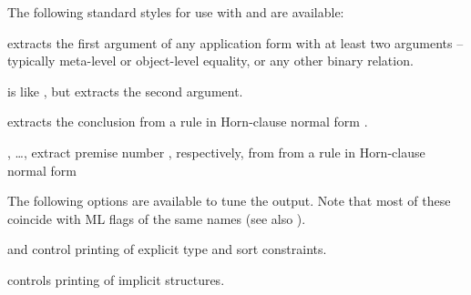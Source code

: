 \begin{isabellebody}
\begin{isamarkuptext}
\begin{descr}
  \end{descr}

  \medskip The following standard styles for use with  and  are available:

  \begin{descr}
  
  \item [\isa{lhs}] extracts the first argument of any application
  form with at least two arguments -- typically meta-level or
  object-level equality, or any other binary relation.
  
  \item [\isa{rhs}] is like , but extracts the second
  argument.
  
  \item [\isa{{\isachardoublequote}concl{\isachardoublequote}}] extracts the conclusion  from a rule
  in Horn-clause normal form .
  
  \item [\isa{{\isachardoublequote}prem{\isadigit{1}}{\isachardoublequote}}, \dots, \isa{{\isachardoublequote}prem{\isadigit{9}}{\isachardoublequote}}] extract premise
  number , respectively, from from a rule in
  Horn-clause normal form 

  \end{descr}

  \medskip
  The following options are available to tune the output.  Note that most of
  these coincide with ML flags of the same names (see also \cite{isabelle-ref}).

  \begin{descr}

  \item[\isa{{\isachardoublequote}show{\isacharunderscore}types\ {\isacharequal}\ bool{\isachardoublequote}} and \isa{{\isachardoublequote}show{\isacharunderscore}sorts\ {\isacharequal}\ bool{\isachardoublequote}}]
  control printing of explicit type and sort constraints.

  \item[\isa{{\isachardoublequote}show{\isacharunderscore}structs\ {\isacharequal}\ bool{\isachardoublequote}}] controls printing of implicit
  structures.


\end{descr}
\end{isamarkuptext}
\end{isabellebody}
